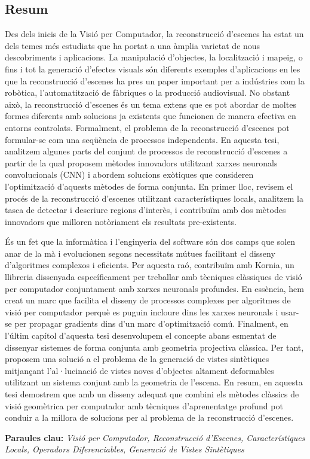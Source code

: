 \begin{otherlanguage}{catalan}
\cleardoublepage
\chapter*{Resum}
\vspace{-24mm}

Des dels inicis de la Visió per Computador, la reconstrucció d'escenes ha estat un dels temes més estudiats que ha portat a una àmplia varietat de nous descobriments i aplicacions. La manipulació d'objectes, la localització i mapeig, o fins i tot la generació d'efectes visuals són diferents exemples d'aplicacions en les que la reconstrucció d'escenes ha pres un paper important per a indústries com la robòtica, l'automatització de fàbriques o la producció audiovisual. No obstant això, la reconstrucció d'escenes és un tema extens que es pot abordar de moltes formes diferents amb solucions ja existents que funcionen de manera efectiva en entorns controlats. Formalment, el problema de la reconstrucció d'escenes pot formular-se com una seqüència de processos independents. En aquesta tesi, analitzem algunes parts del conjunt de processos de reconstrucció d'escenes a partir de la qual proposem mètodes innovadors utilitzant xarxes neuronals convolucionals (CNN) i abordem solucions exòtiques que consideren l'optimització d'aquests mètodes de forma conjunta. En primer lloc, revisem el procés de la reconstrucció d'escenes utilitzant característiques locals, analitzem la tasca de detectar i descriure regions d'interès, i contribuïm amb dos mètodes innovadors que milloren notòriament els resultats pre-existents.

És un fet que la informàtica i l'enginyeria del software són dos camps que solen anar de la mà i evolucionen segons necessitats mútues facilitant el disseny d'algoritmes complexos i eficients. Per aquesta raó, contribuïm amb Kornia, un llibreria dissenyada específicament per treballar amb tècniques clàssiques de visió per computador conjuntament amb xarxes neuronals profundes. En essència, hem creat un marc que facilita el disseny de processos complexes per algoritmes de visió per computador perquè es puguin incloure dins les xarxes neuronals i usar-se per propagar gradients dins d'un marc d'optimització comú. Finalment, en l'últim capítol d'aquesta tesi desenvolupem el concepte abans esmentat de dissenyar sistemes de forma conjunta amb geometria projectiva clàssica. Per tant, proposem una solució a el problema de la generació de vistes sintètiques mitjançant l'al·lucinació de vistes noves d'objectes altament deformables utilitzant un sistema conjunt amb la geometria de l'escena. En resum, en aquesta tesi demostrem que amb un disseny adequat que combini els mètodes clàssics de visió geomètrica per computador amb tècniques d'aprenentatge profund pot conduir a la millora de solucions per al problema de la reconstrucció d'escenes.

\vspace{1mm}
\textbf{Paraules clau:} \textit{Visió per Computador, Reconstrucció d'Escenes, Característiques Locals, Operadors Diferenciables, Generació de Vistes Sintètiques}


\end{otherlanguage}

